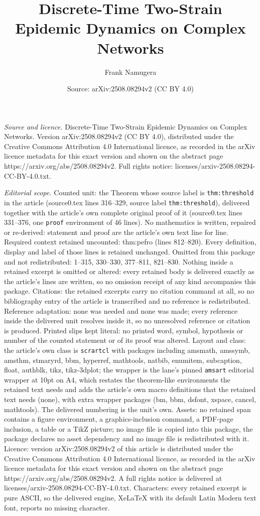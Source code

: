 \documentclass[10pt,a4paper]{amsart}
\title[Discrete-Time Two-Strain Epidemic Dynamics on Complex Networ]{Discrete-Time Two-Strain Epidemic Dynamics on Complex Networks}
\author{Frank Namugera}
\date{Source: arXiv:2508.08294v2 (CC BY 4.0)}
\begin{document}
\maketitle

\noindent\emph{Source and licence.} Discrete-Time Two-Strain Epidemic Dynamics on Complex Networks. Version arXiv:2508.08294v2 (CC BY 4.0), distributed under the Creative Commons Attribution 4.0 International licence, as recorded in the arXiv licence metadata for this exact version and shown on the abstract page https://arxiv.org/abs/2508.08294v2. Full rights notice: licenses/arxiv-2508.08294-CC-BY-4.0.txt.\par\smallskip

\noindent\textit{Editorial scope.} Counted unit: the Theorem whose source label is \texttt{thm:threshold} in the article (source0.tex lines 316--329, source label \texttt{thm:threshold}), delivered together with the article's own complete original proof of it (source0.tex lines 331--376, one \texttt{proof} environment of 46 lines). No mathematics is written, repaired or re-derived: statement and proof are the article's own text line for line. Required context retained uncounted: thm:pefro (lines 812--820). Every definition, display and label of those lines is retained unchanged. Omitted from this package and not redistributed: 1--315, 330--330, 377--811, 821--830. Nothing inside a retained excerpt is omitted or altered: every retained body is delivered exactly as the article's lines are written, so no omission receipt of any kind accompanies this package. Citations: the retained excerpts carry no citation command at all, so no bibliography entry of the article is transcribed and no reference is redistributed. Reference adaptation: none was needed and none was made; every reference inside the delivered unit resolves inside it, so no unresolved reference or citation is produced. Printed slips kept literal: no printed word, symbol, hypothesis or number of the counted statement or of its proof was altered. Layout and class: the article's own class is \texttt{scrartcl} with packages including amsmath, amssymb, amsthm, stmaryrd, bbm, hyperref, mathtools, natbib, enumitem, subcaption, float, authblk, tikz, tikz-3dplot; the wrapper is the lane's pinned \texttt{amsart} editorial wrapper at 10pt on A4, which restates the theorem-like environments the retained text needs and adds the article's own macro definitions that the retained text needs (none), with extra wrapper packages (bm, bbm, dsfont, xspace, cancel, mathtools). The delivered numbering is the unit's own. Assets: no retained span contains a figure environment, a graphics-inclusion command, a PDF-page inclusion, a table or a TikZ picture; no image file is copied into this package, the package declares no asset dependency and no image file is redistributed with it. Licence: version arXiv:2508.08294v2 of this article is distributed under the Creative Commons Attribution 4.0 International licence, as recorded in the arXiv licence metadata for this exact version and shown on the abstract page https://arxiv.org/abs/2508.08294v2. A full rights notice is delivered at licenses/arxiv-2508.08294-CC-BY-4.0.txt. Characters: every retained excerpt is pure ASCII, so the delivered engine, XeLaTeX with its default Latin Modern text font, reports no missing character.
\end{document}
